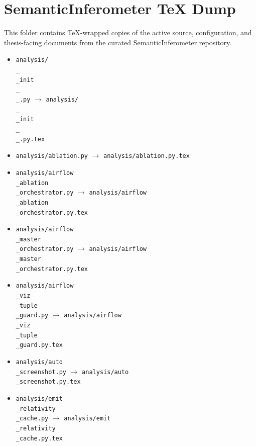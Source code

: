 \documentclass[11pt]{article}
\begin{document}
\section*{SemanticInferometer TeX Dump}
This folder contains TeX-wrapped copies of the active source, configuration, and thesis-facing documents from the curated SemanticInferometer repository.
\begin{itemize}
\item \texttt{analysis/\\_\\_init\\_\\_.py} $\rightarrow$ \texttt{analysis/\\_\\_init\\_\\_.py.tex}
\item \texttt{analysis/ablation.py} $\rightarrow$ \texttt{analysis/ablation.py.tex}
\item \texttt{analysis/airflow\\_ablation\\_orchestrator.py} $\rightarrow$ \texttt{analysis/airflow\\_ablation\\_orchestrator.py.tex}
\item \texttt{analysis/airflow\\_master\\_orchestrator.py} $\rightarrow$ \texttt{analysis/airflow\\_master\\_orchestrator.py.tex}
\item \texttt{analysis/airflow\\_viz\\_tuple\\_guard.py} $\rightarrow$ \texttt{analysis/airflow\\_viz\\_tuple\\_guard.py.tex}
\item \texttt{analysis/auto\\_screenshot.py} $\rightarrow$ \texttt{analysis/auto\\_screenshot.py.tex}
\item \texttt{analysis/emit\\_relativity\\_cache.py} $\rightarrow$ \texttt{analysis/emit\\_relativity\\_cache.py.tex}

\end{itemize}
\end{document}
